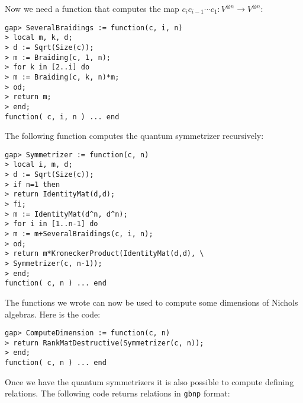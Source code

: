 Now we need a function that computes the map $c_ic_{i-1}\cdots c_1\colon V^{\otimes
n}\to V^{\otimes n}$: 

\begin{lstlisting}
gap> SeveralBraidings := function(c, i, n)
> local m, k, d;
> d := Sqrt(Size(c));
> m := Braiding(c, 1, n);
> for k in [2..i] do
> m := Braiding(c, k, n)*m;
> od;
> return m;
> end;
function( c, i, n ) ... end
\end{lstlisting}

The following function computes the quantum symmetrizer recursively:
\begin{lstlisting}
gap> Symmetrizer := function(c, n)
> local i, m, d;
> d := Sqrt(Size(c));
> if n=1 then
> return IdentityMat(d,d);
> fi;
> m := IdentityMat(d^n, d^n);
> for i in [1..n-1] do
> m := m+SeveralBraidings(c, i, n);
> od;
> return m*KroneckerProduct(IdentityMat(d,d), \
> Symmetrizer(c, n-1));
> end;
function( c, n ) ... end
\end{lstlisting}

%
%
%

The functions we wrote can now be used to compute some dimensions of Nichols
algebras. Here is the code:
\begin{lstlisting}
gap> ComputeDimension := function(c, n)
> return RankMatDestructive(Symmetrizer(c, n));
> end;
function( c, n ) ... end
\end{lstlisting}

Once we have the quantum symmetrizers it is also possible to compute defining
relations. The following code returns relations in \lstinline{gbnp} format:

